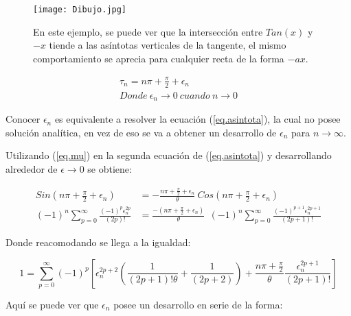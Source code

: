 \begin{figure}
    \centering
    \texttt{[image: Dibujo.jpg]}
    \caption{En este ejemplo, se puede ver que la intersección entre $Tan(x)$ y $-x$ tiende a las asíntotas verticales de la tangente, el mismo comportamiento se aprecia para cualquier recta de la forma $- a x$.}
    \label{fig:Dibujo1}
\end{figure}

\begin{equation}
\begin{array}{c}
    \tau _n = n \pi + \frac{\pi}{2} + \epsilon _n \\[5pt]
    Donde \ \epsilon _n \rightarrow{0}  \ cuando \ n \rightarrow{0}
\end{array}
\label{eq.mu}
\end{equation}


Conocer $\epsilon _n $ es equivalente a resolver la ecuación (\ref{eq.asintota}), la cual no posee solución analítica, en vez de eso se va a obtener un desarrollo de $\epsilon _n $ para $n \rightarrow \infty$.

Utilizando (\ref{eq.mu}) en la segunda ecuación de (\ref{eq.asintota}) y desarrollando alrededor de $\epsilon \rightarrow{0}$ se obtiene:

\begin{equation}
\begin{aligned}
    Sin( n \pi + \frac{\pi}{2} + \epsilon _n ) &= 
    - \frac{n \pi + \frac{\pi}{2} + \epsilon _n}{\theta}  \ Cos( n \pi + \frac{\pi}{2} + \epsilon _n )  \\
         (-1) ^n \sum _{p=0} ^{\infty} \frac{(-1) ^p  \epsilon _n ^{2 p }}{(2p)!} 
    &=  \frac{-(n \pi + \frac{\pi}{2} + \epsilon _n) }{\theta}  \  \	
    (-1) ^n
     \sum _{p=0} ^{\infty} \frac{(-1) ^ {p+1} \epsilon _n ^{2 p + 1}}{(2p+1)!} 
\end{aligned}
\end{equation}


Donde reacomodando se llega a la igualdad:

\begin{equation}
    1 = 
    \sum _{p=0} ^{\infty} (-1) ^p     \left[
   	\epsilon _n ^{2p+2 }\left( \frac{1}{(2p+1)! \theta } + \frac{1}{(2p+2)} \right) +
  	\frac{n \pi + \frac{\pi}{2}}{\theta} \frac{  \epsilon _n ^{2p+1}}{(2p+1)!} 			\right]
\label{igualdad epsilon}
\end{equation}

Aquí se puede ver que  $\epsilon _n $ posee un desarrollo en serie de la forma:

